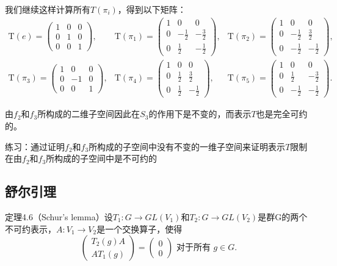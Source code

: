 \documentclass[hyperref,UTF8]{ctexbook}
\begin{document}
我们继续这样计算所有$T\left(\pi_i\right)$，得到以下矩阵：
$$
\begin{aligned}
\mathrm{T}(e)=\begin{pmatrix}
1 & 0 & 0 \\
0 & 1 & 0 \\
0 & 0 & 1
\end{pmatrix}, & \mathrm{T}\left(\pi_1\right)=\begin{pmatrix}
1 & 0 & 0 \\
0 & -\frac{1}{2} & -\frac{3}{2} \\
0 & \frac{1}{2} & -\frac{1}{2}
\end{pmatrix}, & \mathrm{T}\left(\pi_2\right)=\begin{pmatrix}
1 & 0 & 0 \\
0 & -\frac{1}{2} & \frac{3}{2} \\
0 & -\frac{1}{2} & -\frac{1}{2}
\end{pmatrix}, \\
\mathrm{T}\left(\pi_3\right)=\begin{pmatrix}
1 & 0 & 0 \\
0 & -1 & 0 \\
0 & 0 & 1
\end{pmatrix}, & \mathrm{T}\left(\pi_4\right)=\begin{pmatrix}
1 & 0 & 0 \\
0 & \frac{1}{2} & \frac{3}{2} \\
0 & \frac{1}{2} & -\frac{1}{2}
\end{pmatrix}, & \mathrm{T}\left(\pi_5\right)=\begin{pmatrix}
1 & 0 & 0 \\
0 & \frac{1}{2} & -\frac{3}{2} \\
0 & -\frac{1}{2} & -\frac{1}{2}
\end{pmatrix} .
\end{aligned}$$

由$f_2$和$f_3$所构成的二维子空间因此在$S_3$的作用下是不变的，而表示$T$也是完全可约的。

练习：通过证明$f_2$和$f_3$所构成的子空间中没有不变的一维子空间来证明表示$T$限制在由$f_2$和$f_3$所构成的子空间中是不可约的
\subsection{舒尔引理}

定理4.6（Schur's lemma）设$T_1: G \rightarrow GL(V_1)$和$T_2: G \rightarrow GL(V_2)$是群G的两个不可约表示，$A: V_1 \rightarrow V_2$是一个交换算子，使得
$$
\begin{pmatrix}
T_2(g) A \\ 
A T_1(g)
\end{pmatrix}
=
\begin{pmatrix}
0 \\ 
0
\end{pmatrix}
\text { 对于所有 } g \in G .
$$
\end{document}

